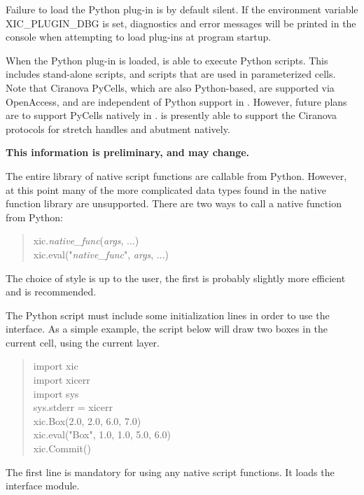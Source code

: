 Failure to load the Python plug-in is by default silent.  If the
environment variable {\vt XIC\_PLUGIN\_DBG} is set, diagnostics and
error messages will be printed in the console when attempting to load
plug-ins at program startup.

When the Python plug-in is loaded, {\Xic} is able to execute Python
scripts.  This includes stand-alone scripts, and scripts that are used
in parameterized cells.  Note that Ciranova PyCells, which are also
Python-based, are supported via OpenAccess, and are independent of
Python support in {\Xic}.  However, future plans are to support
PyCells natively in {\Xic}.  {\Xic} is presently able to support the
Ciranova protocols for stretch handles and abutment natively.

{\bf This information is preliminary, and may change.}

The entire library of native script functions are callable from
Python.  However, at this point many of the more complicated data
types found in the native function library are unsupported.  There are
two ways to call a native function from Python:

\begin{quote}
{\vt xic.}{\it native\_func\/}{\vt (}{\it args\/}, ...{\vt )}\\
{\vt xic.eval}{\vt ("}{\it native\_func\/}{\vt ",} {\it args\/}, {\vt ...)}
\end{quote}

The choice of style is up to the user, the first is probably slightly
more efficient and is recommended.

The Python script must include some initialization lines in order to
use the {\Xic} interface.  As a simple example, the script below will
draw two boxes in the current cell, using the current layer.

\begin{quote}\vt
import xic\\
import xicerr\\
import sys\\
sys.stderr = xicerr\\
xic.Box(2.0, 2.0, 6.0, 7.0)\\
xic.eval("Box", 1.0, 1.0, 5.0, 6.0)\\
xic.Commit()\\
\end{quote}

The first line is mandatory for using any native script functions.  It
loads the {\Xic} interface module.

